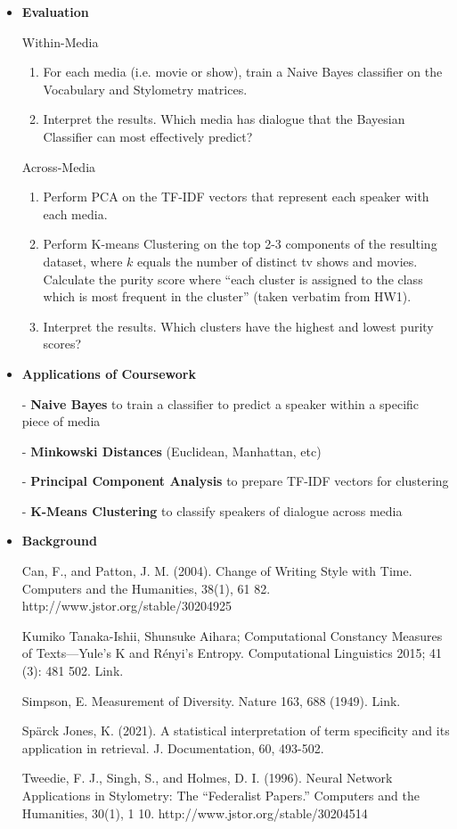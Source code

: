 \documentclass{article}
\begin{document}
\begin{titlepage}
\begin{itemize}
		\item[] \textbf{Evaluation}

		Within-Media

		\begin{enumerate}
			\item For each media (i.e. movie or show), train a Naive Bayes classifier on the Vocabulary and Stylometry matrices.
			\item Interpret the results. Which media has dialogue that the Bayesian Classifier can most effectively predict?
		\end{enumerate}

		Across-Media

		\begin{enumerate}
			\item Perform PCA on the TF-IDF vectors that represent each speaker with each media.
			\item Perform K-means Clustering on the top 2-3 components of the resulting dataset, where $k$ equals the number of distinct tv shows and movies. Calculate the purity score where ``each cluster is assigned to the class which is most frequent in the cluster'' (taken verbatim from HW1).
			\item Interpret the results. Which clusters have the highest and lowest purity scores?
		\end{enumerate}
		

\item[] \textbf{Applications of Coursework}

- \textbf{Naive Bayes} to train a classifier to predict a speaker within a specific piece of media

- \textbf{Minkowski Distances} (Euclidean, Manhattan, etc)

- \textbf{Principal Component Analysis} to prepare TF-IDF vectors for clustering

- \textbf{K-Means Clustering} to classify speakers of dialogue across media

\item[] \textbf{Background}

Can, F., and Patton, J. M. (2004). Change of Writing Style with Time. Computers and the Humanities, 38(1), 61 82. http://www.jstor.org/stable/30204925

Kumiko Tanaka-Ishii, Shunsuke Aihara; Computational Constancy Measures of Texts—Yule's K and Rényi's Entropy. Computational Linguistics 2015; 41 (3): 481 502. Link.

Simpson, E. Measurement of Diversity. Nature 163, 688 (1949). Link. 

Spärck Jones, K. (2021). A statistical interpretation of term specificity and its application in retrieval. J. Documentation, 60, 493-502.

Tweedie, F. J., Singh, S., and Holmes, D. I. (1996). Neural Network Applications in Stylometry: The “Federalist Papers.” Computers and the Humanities, 30(1), 1 10. http://www.jstor.org/stable/30204514
   

    \end{itemize}
	
	\pagebreak

\end{titlepage}
\end{document}
